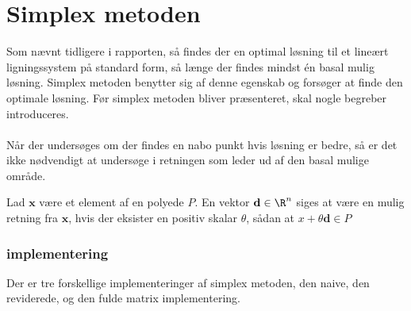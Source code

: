 \chapter{Simplex metoden}
Som nævnt tidligere i rapporten, så findes der en optimal løsning til et lineært ligningssystem på standard form, så længe der findes mindst én basal mulig løsning. 
Simplex metoden benytter sig af denne egenskab og forsøger at finde den optimale løsning. Før simplex metoden bliver præsenteret, skal nogle begreber introduceres.
%
\\\\
%
Når der undersøges om der findes en nabo punkt hvis løsning er bedre, så er det ikke nødvendigt at undersøge i retningen som leder ud af den basal mulige område.

\begin{defn}{}{}
Lad $\textbf{x}$ være et element af en polyede $P$.
En vektor $\textbf{d}\in \R^n$ siges at være en mulig retning fra $\textbf{x}$, hvis der eksister en positiv skalar $\theta$, sådan at $x+\theta \textbf{d}\in P$
\end{defn}
%


\subsection{implementering}
Der er tre forskellige implementeringer af simplex metoden, den naive, den reviderede, og den fulde matrix implementering. 
